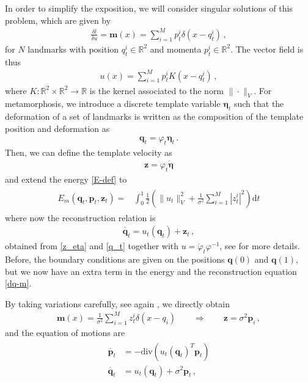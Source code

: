 \documentclass[runningheads]{llncs}
\newcommand{\half}{\frac 12}
\newcommand{\norm}[2]{\| #1 \|_{ #2 }}
\newcommand{\vnorm}[1]{\norm{ #1 }{V}}
\newcommand{\diff}[1]{\text{d} #1}
\newcommand{\mdiv}{\text{div}}
\begin{document}
In order to simplify the exposition, we will consider singular solutions of this
problem, which are given by
\begin{align}
  \frac{\delta l}{\delta u} = \mathbf m(x) = \sum_{i=1}^M p_t^i \delta(x-q_t^i)\,, 
\end{align}
for $N$ landmarks with position $q_t^i\in \mathbb R^2 $ and momenta $p_t^i \in
\mathbb R^2$. The vector field is thus 
\begin{align}
  u(x) = \sum_{i=1}^M p_t^i K(x-q_t^i)\,, 
  \label{u-def}
\end{align}
where $K:\mathbb R^2\times \mathbb R^2\to \mathbb R$ is the kernel associated to
the norm $\|\cdot \|_V$.  For metamorphosis, we introduce a discrete template
variable $\boldsymbol \eta_t$ such that the deformation of a set of landmarks is
written as the composition of the template position and deformation as
\begin{align}
  \mathbf q_t = \varphi_t \boldsymbol \eta_t\, . 
  \label{q_t}
\end{align}
Then, we can define the template velocity as 
\begin{align}
  \mathbf z = \varphi_t \dot {\boldsymbol \eta}
  \label{z_eta}
\end{align}
and extend the energy \eqref{E-def} to 
\begin{align}
  \begin{split}
    E_m(\mathbf q_t, \mathbf p_t, \mathbf z_t) = & \int_0^1
    \half  \left (\vnorm{u_t}^2 + \frac{1}{\sigma^2} \sum_{i=1}^M |z_t^i|^2\right )\diff{t}
  \end{split}
  \label{E_m-def}
\end{align}
where now the reconstruction relation is 
\begin{align}
    \dot{\mathbf q_t} = u_t (\mathbf q_t) + \mathbf z_t\, , 
    \label{dq-m}
\end{align}
obtained from \eqref{z_eta} and \eqref{q_t} together with  $u= \dot \varphi_t \varphi^{-1}$, 
see \cite{holm2009euler} for more details.  
Before, the boundary conditions are given on the positions $\mathbf q(0)$ and $\mathbf
q(1)$, but we now have an extra term in the energy and the reconstruction
equation \eqref{dq-m}. 

By taking variations carefully, see again \cite{holm2009euler}, we directly obtain 
\begin{align}
  \mathbf m(x) = \frac{1}{\sigma^2} \sum_{i=1}^M z_t^i\delta(x-q_i)\qquad \Rightarrow \qquad
  \mathbf z = \sigma^2 \mathbf p_i\, , 
\end{align}
and the equation of motions are
\begin{align}
  \begin{split}
  \dot{\mathbf p_t} &= -\mdiv (u_t(\mathbf q_t)^T \mathbf p_t)\\ 
  \dot{\mathbf q_t} &= u_t(\mathbf q_t) +  \sigma^2\mathbf p_t \,,
  \end{split}
  \label{eq-m-classic}
\end{align}
\end{document}
